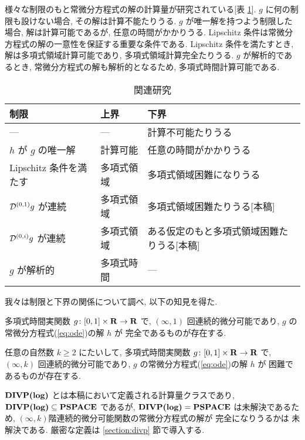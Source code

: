 様々な制限のもと常微分方程式の解の計算量が研究されている[表 \ref{table:related}].
$g$ に何の制限も設けない場合, その解は計算不能たりうる.
$g$ が唯一解を持つよう制限した場合, 解は計算可能であるが, 任意の時間がかかりうる.
Lipschitz 条件は常微分方程式の解の一意性を保証する重要な条件である.
Lipschitz 条件を満たすとき, 解は多項式領域計算可能であり, 多項式領域計算完全たりうる.
$g$ が解析的であるとき, 常微分方程式の解も解析的となるため, 多項式時間計算可能である.

\begin{table}
\renewcommand\arraystretch{1.5}
\begin{center}
 \caption{関連研究}
 \label{table:related}
 \begin{tabular}{llp{}}
  制限 & 上界 & 下界 \\
  \hline
   --- & --- & 計算不可能たりうる \cite{todo} \\
  $h$ が $g$ の唯一解 & 計算可能 \cite{todo} & 任意の時間がかかりうる \cite{todo} \\
  Lipschitz 条件を満たす & 多項式領域 &
	  多項式領域困難になりうる \cite{kawamura2010lipschitz}\\
  $\mathcal D^{(0,1)}g$ が連続 & 多項式領域 & 多項式領域困難たりうる[本稿] \\
  $\mathcal D^{(0,i)}g$ が連続 & 多項式領域 & ある仮定のもと多項式領域困難たりうる[本稿] \\
  $g$ が解析的 & 多項式時間 \cite{todo} & ---
 \end{tabular}
\end{center}
\end{table}

我々は制限と下界の関係について調べ, 以下の知見を得た.

 \begin{theorem}
  \label{DifferentiableIsPspace}
  多項式時間実関数 $g \colon [0,1] \times \mathbf R \to \mathbf R$ で,
  $(\infty, 1)$ 回連続的微分可能であり,
  $g$ の常微分方程式(\ref{eq:ode})の解 $h$ が \PSPACE 完全であるものが存在する.
 \end{theorem}

 \begin{theorem}
  \label{KTimesIsPspace}
  任意の自然数 $k \ge 2$ にたいして, 
  多項式時間実関数 $g \colon [0,1] \times \mathbf R \to \mathbf R$ で, 
  $(\infty, k)$ 回連続的微分可能であり,
  $g$ の常微分方程式(\ref{eq:ode})の解 $h$ が \DIVPlog 困難であるものが存在する.
 \end{theorem}

 $\text{\bf DIVP(log)}$ とは本稿において定義される計算量クラスであり,
 $\text{\bf DIVP(log)} \subseteq {\bf PSPACE}$ であるが, $\text{\bf DIVP(log)} = {\bf PSPACE}$ は未解決であるため,
 $(\infty, k)$階連続的微分可能関数の常微分方程式の解が \PSPACE 完全になりうるかは
 未解決である.
 厳密な定義は \ref{section:divp} 節で導入する.

